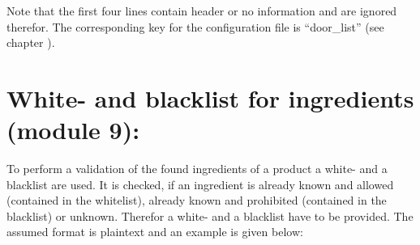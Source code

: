 \documentclass[letterpaper,10pt,english]{sphinxmanual}
\begin{document}
%
\begin{sphinxVerbatim}[commandchars=\\\{\}]
                                                                             
 
\end{sphinxVerbatim}

Note that the first four lines contain header or no information and
are ignored therefor. The corresponding key for the configuration
file is “door\_list” (see chapter {\hyperref[\detokenize{configuration:configuration}]{}}).


\section{White- and blacklist for ingredients (module 9):}
\label{\detokenize{external_data:white-and-blacklist-for-ingredients-module-9}}\label{\detokenize{external_data:external-black-white}}
To perform a validation of the found ingredients of a product a white-
and a blacklist are used. It is checked, if an ingredient is already
known and allowed (contained in the whitelist), already known and
prohibited (contained in the blacklist) or unknown. Therefor a white-
and a blacklist have to be provided. The assumed format is plaintext
and an example is given below:
\end{document}
